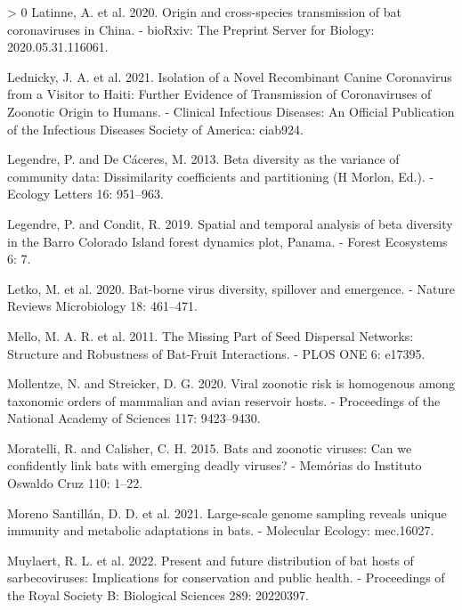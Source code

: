\documentclass[11pt]{article}
\newlength{\cslhangindent}
\newenvironment{CSLReferences}[3] %
 {%
  \setlength{\parindent}{0pt}
  \ifodd #1 \everypar{\setlength{\hangindent}{\cslhangindent}}\ignorespaces\fi
  \ifnum #2 > 0
  \setlength{\parskip}{#2\baselineskip}
  \fi
 }%
 {}
\begin{document}
\begin{CSLReferences}{1}{0}
\leavevmode\hypertarget{ref-Latinne2020OriCro}{}%
Latinne, A. et al. 2020. Origin and cross-species transmission of bat
coronaviruses in China. - bioRxiv: The Preprint Server for Biology:
2020.05.31.116061.

\leavevmode\hypertarget{ref-Lednicky2021IsoNov}{}%
Lednicky, J. A. et al. 2021. Isolation of a Novel Recombinant Canine
Coronavirus from a Visitor to Haiti: Further Evidence of Transmission of
Coronaviruses of Zoonotic Origin to Humans. - Clinical Infectious
Diseases: An Official Publication of the Infectious Diseases Society of
America: ciab924.

\leavevmode\hypertarget{ref-Legendre2013BetDiv}{}%
Legendre, P. and De Cáceres, M. 2013. Beta diversity as the variance of
community data: Dissimilarity coefficients and partitioning (H Morlon,
Ed.). - Ecology Letters 16: 951--963.

\leavevmode\hypertarget{ref-Legendre2019SpaTem}{}%
Legendre, P. and Condit, R. 2019. Spatial and temporal analysis of beta
diversity in the Barro Colorado Island forest dynamics plot, Panama. -
Forest Ecosystems 6: 7.

\leavevmode\hypertarget{ref-Letko2020BatVir}{}%
Letko, M. et al. 2020. Bat-borne virus diversity, spillover and
emergence. - Nature Reviews Microbiology 18: 461--471.

\leavevmode\hypertarget{ref-Mello2011MisPar}{}%
Mello, M. A. R. et al. 2011. The Missing Part of Seed Dispersal
Networks: Structure and Robustness of Bat-Fruit Interactions. - PLOS ONE
6: e17395.

\leavevmode\hypertarget{ref-Mollentze2020VirZoo}{}%
Mollentze, N. and Streicker, D. G. 2020. Viral zoonotic risk is
homogenous among taxonomic orders of mammalian and avian reservoir
hosts. - Proceedings of the National Academy of Sciences 117:
9423--9430.

\leavevmode\hypertarget{ref-Moratelli2015BatZoo}{}%
Moratelli, R. and Calisher, C. H. 2015. Bats and zoonotic viruses: Can
we confidently link bats with emerging deadly viruses? - Memórias do
Instituto Oswaldo Cruz 110: 1--22.

\leavevmode\hypertarget{ref-MorenoSantillan2021LarGen}{}%
Moreno Santillán, D. D. et al. 2021. Large-scale genome sampling reveals
unique immunity and metabolic adaptations in bats. - Molecular Ecology:
mec.16027.

\leavevmode\hypertarget{ref-Muylaert2022PreFut}{}%
Muylaert, R. L. et al. 2022. Present and future distribution of bat
hosts of sarbecoviruses: Implications for conservation and public
health. - Proceedings of the Royal Society B: Biological Sciences 289:
20220397.


\end{CSLReferences}
\end{document}
